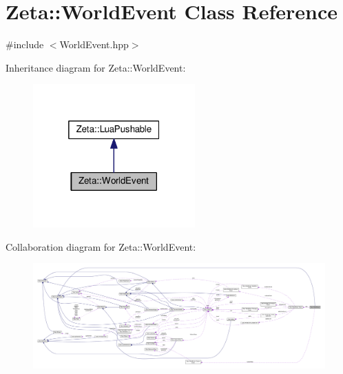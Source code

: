 \hypertarget{classZeta_1_1WorldEvent}{\section{Zeta\+:\+:World\+Event Class Reference}
\label{classZeta_1_1WorldEvent}
}


{\ttfamily \#include $<$World\+Event.\+hpp$>$}



Inheritance diagram for Zeta\+:\+:World\+Event\+:\nopagebreak
\begin{figure}[H]
\begin{center}
\leavevmode
\includegraphics[width=176pt]{classZeta_1_1WorldEvent__inherit__graph}
\end{center}
\end{figure}


Collaboration diagram for Zeta\+:\+:World\+Event\+:
\nopagebreak
\begin{figure}[H]
\begin{center}
\leavevmode
\includegraphics[width=350pt]{classZeta_1_1WorldEvent__coll__graph}
\end{center}
\end{figure}
